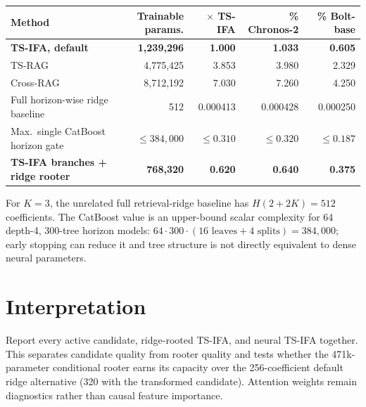 \documentclass[10pt]{article}
\begin{document}
\begin{center}
\small
\begin{tabular}{lrrrr}
\toprule
Method & Trainable params. & $\times$ TS-IFA & \% Chronos-2 & \% Bolt-base\\
\midrule
\textbf{TS-IFA, default} & \textbf{1,239,296} & \textbf{1.000} & \textbf{1.033} & \textbf{0.605}\\
TS-RAG & 4,775,425 & 3.853 & 3.980 & 2.329\\
Cross-RAG & 8,712,192 & 7.030 & 7.260 & 4.250\\
Full horizon-wise ridge baseline & 512 & 0.000413 & 0.000428 & 0.000250\\
Max.\ single CatBoost horizon gate & $\leq384,000$ & $\leq0.310$ & $\leq0.320$ & $\leq0.187$\\
\textbf{TS-IFA branches + ridge rooter} & \textbf{768,320} & \textbf{0.620} & \textbf{0.640} & \textbf{0.375}\\
\bottomrule
\end{tabular}
\end{center}

For $K=3$, the unrelated full retrieval-ridge baseline has
$H(2+2K)=512$ coefficients.  The CatBoost value is an upper-bound scalar
complexity for 64 depth-4, 300-tree horizon models:
$64\cdot300\cdot(16\text{ leaves}+4\text{ splits})=384,000$; early stopping can
reduce it and tree structure is not directly equivalent to dense neural
parameters.

\section{Interpretation}
Report every active candidate, ridge-rooted TS-IFA, and neural TS-IFA together.
This separates candidate quality from rooter quality and tests whether the
471k-parameter conditional rooter earns its capacity over the 256-coefficient
default ridge alternative (320 with the transformed candidate).  Attention
weights remain diagnostics rather than causal feature importance.
\end{document}
